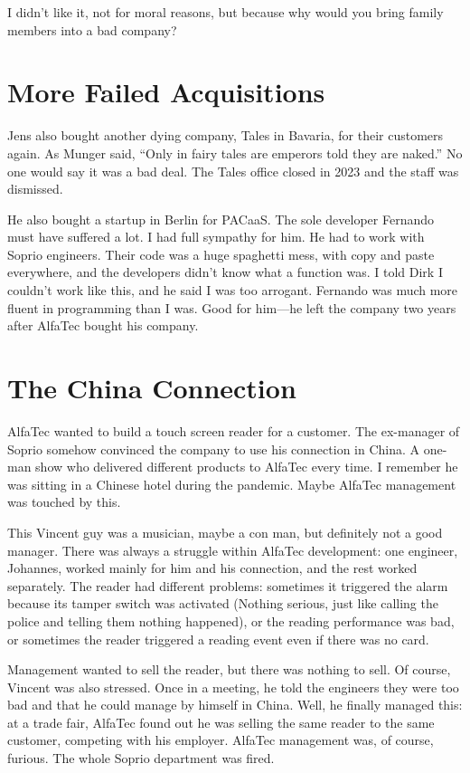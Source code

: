 I didn't like it, not for moral reasons, but because why would you bring family members into a bad company? 
\section{More Failed Acquisitions}

Jens also bought another dying company, Tales in Bavaria, for their customers again. As Munger said, ``Only in fairy tales are emperors told they are naked.'' No one would say it was a bad deal. The Tales office closed in 2023 and the staff was dismissed.

He also bought a startup in Berlin for PACaaS. The sole developer Fernando must have suffered a lot. I had full sympathy for him. He had to work with Soprio engineers. Their code was a huge spaghetti mess, with copy and paste everywhere, and the developers didn't know what a function was. I told Dirk I couldn't work like this, and he said I was too arrogant. Fernando was much more fluent in programming than I was. Good for him—he left the company two years after AlfaTec bought his company.

\section{The China Connection}

AlfaTec wanted to build a touch screen reader for a customer. The ex-manager of Soprio somehow convinced the company to use his connection in China. A one-man show who delivered different products to AlfaTec every time. I remember he was sitting in a Chinese hotel during the pandemic. Maybe AlfaTec management was touched by this.

This Vincent guy was a musician, maybe a con man, but definitely not a good manager. There was always a struggle within AlfaTec development: one engineer, Johannes, worked mainly for him and his connection, and the rest worked separately. The reader had different problems: sometimes it triggered the alarm because its tamper switch was activated (Nothing serious, just like calling the police and telling them nothing happened), or the reading performance was bad, or sometimes the reader triggered a reading event even if there was no card.

Management wanted to sell the reader, but there was nothing to sell. Of course, Vincent was also stressed. Once in a meeting, he told the engineers they were too bad and that he could manage by himself in China. Well, he finally managed this: at a trade fair, AlfaTec found out he was selling the same reader to the same customer, competing with his employer. AlfaTec management was, of course, furious. The whole Soprio department was fired.

